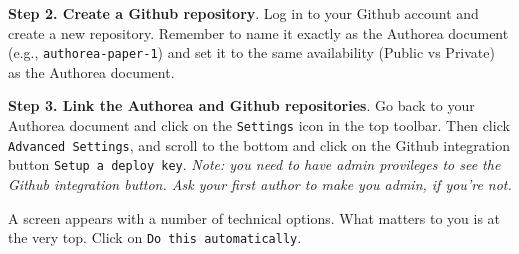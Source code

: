 \textbf{Step 2. Create a Github repository}. Log in to your Github account and create a new repository. Remember to name it exactly as the Authorea document (e.g., \verb|authorea-paper-1|) and set it to the same availability (Public vs Private) as the Authorea document.

\textbf{Step 3. Link the Authorea and Github repositories}. Go back to your Authorea document and click on the \verb|Settings| icon in the top toolbar. Then click \verb|Advanced Settings|, and scroll to the bottom and click on the Github integration button \verb|Setup a deploy key|. \textit{Note: you need to have admin provileges to see the Github integration button. Ask your first author to make you admin, if you're not.} 

A screen appears with a number of technical options. What matters to you is at the very top. Click on \verb|Do this automatically|. 



